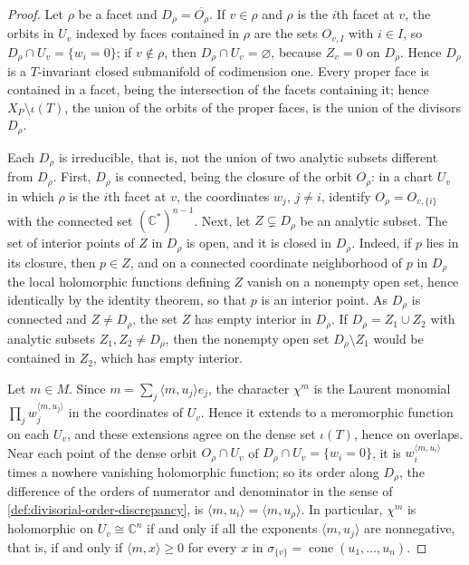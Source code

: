 \begin{proof}
Let $\rho$ be a facet and $D_\rho=\overline{O_\rho}$. If $v\in\rho$ and $\rho$ is the $i$th facet at $v$, the orbits in $U_v$ indexed by faces contained in $\rho$ are the sets $O_{v,I}$ with $i\in I$, so $D_\rho\cap U_v=\{w_i=0\}$; if $v\notin\rho$, then $D_\rho\cap U_v=\varnothing$, because $Z_v=0$ on $D_\rho$. Hence $D_\rho$ is a $T$-invariant closed submanifold of codimension one. Every proper face is contained in a facet, being the intersection of the facets containing it; hence $X_P\setminus\iota(T)$, the union of the orbits of the proper faces, is the union of the divisors $D_\rho$.

Each $D_\rho$ is irreducible, that is, not the union of two analytic subsets different from $D_\rho$. First, $D_\rho$ is connected, being the closure of the orbit $O_\rho$: in a chart $U_v$ in which $\rho$ is the $i$th facet at $v$, the coordinates $w_j$, $j\neq i$, identify $O_\rho=O_{v,\{i\}}$ with the connected set $(\mathbb C^*)^{n-1}$. Next, let $Z\subsetneq D_\rho$ be an analytic subset. The set of interior points of $Z$ in $D_\rho$ is open, and it is closed in $D_\rho$. Indeed, if $p$ lies in its closure, then $p\in Z$, and on a connected coordinate neighborhood of $p$ in $D_\rho$ the local holomorphic functions defining $Z$ vanish on a nonempty open set, hence identically by the identity theorem, so that $p$ is an interior point. As $D_\rho$ is connected and $Z\neq D_\rho$, the set $Z$ has empty interior in $D_\rho$. If $D_\rho=Z_1\cup Z_2$ with analytic subsets $Z_1,Z_2\neq D_\rho$, then the nonempty open set $D_\rho\setminus Z_1$ would be contained in $Z_2$, which has empty interior.

Let $m\in M$. Since $m=\sum_j\langle m,u_j\rangle e_j$, the character $\chi^m$ is the Laurent monomial $\prod_jw_j^{\langle m,u_j\rangle}$ in the coordinates of $U_v$. Hence it extends to a meromorphic function on each $U_v$, and these extensions agree on the dense set $\iota(T)$, hence on overlaps. Near each point of the dense orbit $O_\rho\cap U_v$ of $D_\rho\cap U_v=\{w_i=0\}$, it is $w_i^{\langle m,u_i\rangle}$ times a nowhere vanishing holomorphic function; so its order along $D_\rho$, the difference of the orders of numerator and denominator in the sense of \cref{def:divisorial-order-discrepancy}, is $\langle m,u_i\rangle=\langle m,u_\rho\rangle$. In particular, $\chi^m$ is holomorphic on $U_v\cong\mathbb C^n$ if and only if all the exponents $\langle m,u_j\rangle$ are nonnegative, that is, if and only if $\langle m,x\rangle\geq0$ for every $x$ in $\sigma_{\{v\}}=\operatorname{cone}(u_1,\ldots,u_n)$.
\end{proof}

